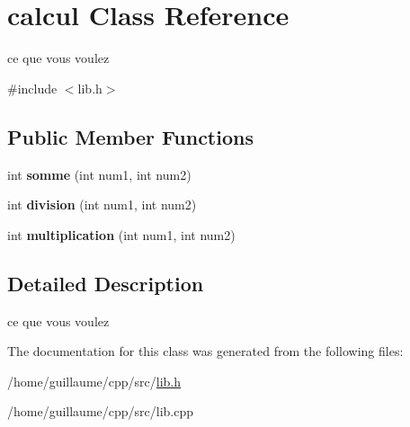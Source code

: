 \hypertarget{classcalcul}{}\section{calcul Class Reference}
\label{classcalcul}


ce que vous voulez  




{\ttfamily \#include $<$lib.\+h$>$}

\subsection*{Public Member Functions}
\begin{DoxyCompactItemize}
\item 
\mbox{\label{classcalcul_a6646162c335249d20290b7811a49add2}} 
int {\bfseries somme} (int num1, int num2)
\item 
\mbox{\label{classcalcul_a2bacdd33a2a25443882a433e3b98a9dd}} 
int {\bfseries division} (int num1, int num2)
\item 
\mbox{\label{classcalcul_a0a820459237fc61cb314cabc385f1766}} 
int {\bfseries multiplication} (int num1, int num2)
\end{DoxyCompactItemize}


\subsection{Detailed Description}
ce que vous voulez 

The documentation for this class was generated from the following files\+:\begin{DoxyCompactItemize}
\item 
/home/guillaume/cpp/src/\hyperlink{lib_8h}{lib.\+h}\item 
/home/guillaume/cpp/src/lib.\+cpp\end{DoxyCompactItemize}
